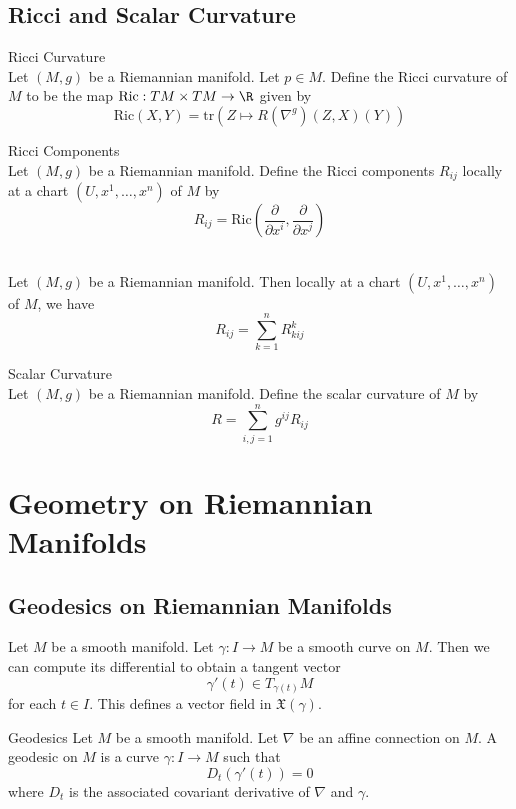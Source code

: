 \documentclass[a4paper]{article}
\begin{document}
\subsection{Ricci and Scalar Curvature}
\begin{defn}{Ricci Curvature}{}\\
Let $(M,g)$ be a Riemannian manifold. Let $p\in M$. Define the Ricci curvature of $M$ to be the map $\text{Ric}:TM\times TM\to\R$ given by $$\text{Ric}(X,Y)=\text{tr}(Z\mapsto R(\nabla^g)(Z,X)(Y))$$
\end{defn}

\begin{defn}{Ricci Components}{}\\
Let $(M,g)$ be a Riemannian manifold. Define the Ricci components $R_{ij}$ locally at a chart $(U,x^1,\dots,x^n)$ of $M$ by $$R_{ij}=\text{Ric}\left(\frac{\partial}{\partial x^i},\frac{\partial}{\partial x^j}\right)$$
\end{defn}

\begin{prp}{}{}\\
Let $(M,g)$ be a Riemannian manifold. Then locally at a chart $(U,x^1,\dots,x^n)$ of $M$, we have $$R_{ij}=\sum_{k=1}^nR_{kij}^k$$
\end{prp}

\begin{defn}{Scalar Curvature}{}\\
Let $(M,g)$ be a Riemannian manifold. Define the scalar curvature of $M$ by $$R=\sum_{i,j=1}^ng^{ij}R_{ij}$$
\end{defn}

\pagebreak
\section{Geometry on Riemannian Manifolds}
\subsection{Geodesics on Riemannian Manifolds}
Let $M$ be a smooth manifold. Let $\gamma:I\to M$ be a smooth curve on $M$. Then we can compute its differential to obtain a tangent vector $$\gamma'(t)\in T_{\gamma(t)}M$$ for each $t\in I$. This defines a vector field in $\mathfrak{X}(\gamma)$. 

\begin{defn}{Geodesics}{} Let $M$ be a smooth manifold. Let $\nabla$ be an affine connection on $M$. A geodesic on $M$ is a curve $\gamma:I\to M$ such that $$D_t(\gamma'(t))=0$$ where $D_t$ is the associated covariant derivative of $\nabla$ and $\gamma$. 
\end{defn}
\end{document}
